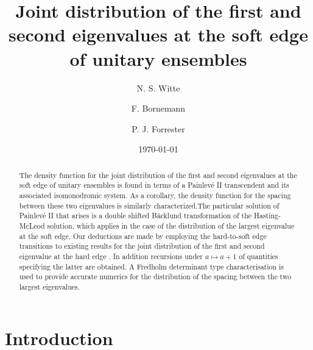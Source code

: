 \documentclass[10pt,reqno]{amsart}
\theoremstyle{plain}
\theoremstyle{definition}
\theoremstyle{remark}
\begin{document}
\title[Joint distribution of \dots at the soft edge of unitary ensembles]{Joint distribution of the first and second eigenvalues at the soft edge of unitary ensembles}
\author{N. S. Witte}
\address{Dept. of Mathematics and Statistics, University of Melbourne, Victoria 3010, Australia}
\author{F. Bornemann}
\address{Zentrum Mathematik -- M3, Technische UniversitÃ¤t MÃ¼nchen,
      80290~MÃ¼nchen, Germany}
\author{P. J. Forrester}
\address{Dept. of Mathematics and Statistics, University of Melbourne, Victoria 3010, Australia}
\date{\today}

\begin{abstract}
The density function for the joint distribution of the first and second eigenvalues at the soft edge of 
unitary ensembles is found in terms of a Painlev\'e II transcendent and its associated isomonodromic
system. As a corollary, the density function for the spacing between these two eigenvalues is similarly
characterized.The particular solution of Painlev\'e II that arises is a double shifted B\"acklund
transformation of the Hasting-McLeod solution, which applies in the case of the distribution of 
the largest eigenvalue at the soft edge. Our deductions are made by employing the hard-to-soft edge
transitions to existing results for the joint distribution of the first and second eigenvalue 
at the hard edge \cite{FW_2007}. In addition recursions under  $a \mapsto a+1$ of quantities specifying 
the latter are obtained. A Fredholm determinant type characterisation is used to provide accurate numerics
for the distribution of the spacing between the two largest eigenvalues.
\end{abstract} 


\maketitle

\section{Introduction}\label{newIntro}
\setcounter{equation}{0}
\end{document}
